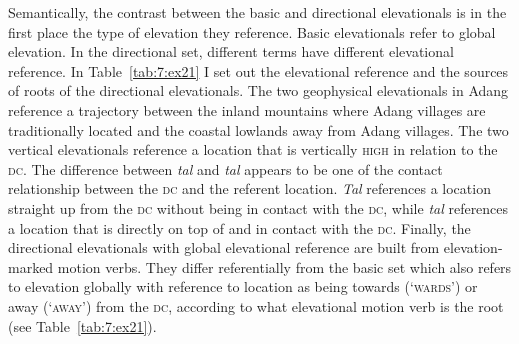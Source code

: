 Semantically, the contrast between the basic and directional elevationals is in the first place the type of elevation they reference. Basic elevationals refer to global elevation. In the directional set, different terms have different elevational reference. In Table~\ref{tab:7:ex21} I set out the elevational reference and the sources of roots of the directional elevationals. The two geophysical elevationals in Adang reference a trajectory between the inland mountains where Adang villages are traditionally located and the coastal lowlands away from Adang villages. The two vertical elevationals reference a location that is vertically \textsc{high} in relation to the \textsc{dc}. The difference between \textit{ta}\textit{{\textglotstop}}\textit{l}\textit{{\textepsilon}} and \textit{tal}\textit{{\textepsilon}} appears to be one of the contact relationship between the \textsc{dc} and the referent location. \textit{Ta}\textit{{\textglotstop}}\textit{l}\textit{{\textepsilon}} references a location straight up from the \textsc{dc} without being in contact with the \textsc{dc}, while \textit{tal}\textit{{\textepsilon}} references a location that is directly on top of and in contact with the \textsc{dc}. Finally, the directional elevationals with global elevational reference are built from elevation-marked motion verbs. They differ referentially from the basic set which also refers to elevation globally with reference to location as being towards (`\textsc{wards}') or away (`\textsc{away}') from the \textsc{dc}, according to what elevational motion verb is the root (see Table~\ref{tab:7:ex21}).  


